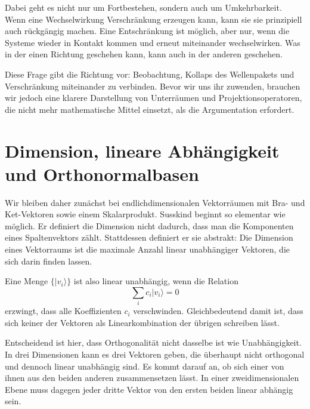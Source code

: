 Dabei geht es nicht nur um Fortbestehen, sondern auch um Umkehrbarkeit. Wenn eine Wechselwirkung Verschränkung erzeugen kann, kann sie sie prinzipiell auch rückgängig machen. Eine Entschränkung ist möglich, aber nur, wenn die Systeme wieder in Kontakt kommen und erneut miteinander wechselwirken. Was in der einen Richtung geschehen kann, kann auch in der anderen geschehen.

\begin{classroomqa}\end{classroomqa}

Diese Frage gibt die Richtung vor: Beobachtung, Kollaps des Wellenpakets und Verschränkung miteinander zu verbinden. Bevor wir uns ihr zuwenden, brauchen wir jedoch eine klarere Darstellung von Unterräumen und Projektionsoperatoren, die nicht mehr mathematische Mittel einsetzt, als die Argumentation erfordert.

\section{Dimension, lineare Abhängigkeit und Orthonormalbasen}

Wir bleiben daher zunächst bei endlichdimensionalen Vektorräumen mit Bra- und Ket-Vektoren sowie einem Skalarprodukt. Susskind beginnt so elementar wie möglich. Er definiert die Dimension nicht dadurch, dass man die Komponenten eines Spaltenvektors zählt. Stattdessen definiert er sie abstrakt: Die Dimension eines Vektorraums ist die maximale Anzahl linear unabhängiger Vektoren, die sich darin finden lassen.

Eine Menge \(\{|v_i\rangle\}\) ist also linear unabhängig, wenn die Relation
\begin{equation}
\sum_i c_i |v_i\rangle = 0
\end{equation}
erzwingt, dass alle Koeffizienten \(c_i\) verschwinden. Gleichbedeutend damit ist, dass sich keiner der Vektoren als Linearkombination der übrigen schreiben lässt.

Entscheidend ist hier, dass Orthogonalität nicht dasselbe ist wie Unabhängigkeit. In drei Dimensionen kann es drei Vektoren geben, die überhaupt nicht orthogonal und dennoch linear unabhängig sind. Es kommt darauf an, ob sich einer von ihnen aus den beiden anderen zusammensetzen lässt. In einer zweidimensionalen Ebene muss dagegen jeder dritte Vektor von den ersten beiden linear abhängig sein.

